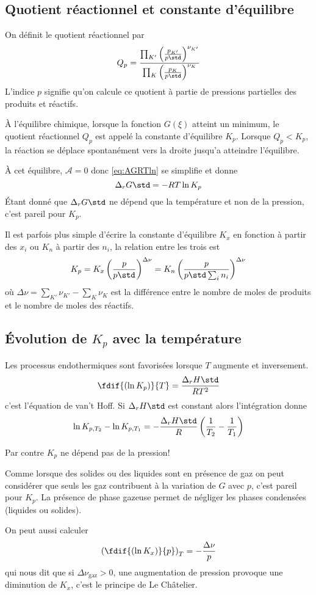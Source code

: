 \subsection{Quotient réactionnel et constante d'équilibre}
On définit le quotient réactionnel par
\[ Q_p = \frac {\prod_{K'}\left(\frac{p_{K'}}{p\std}\right)^{\nu_{K'}}}
{\prod_{K}\left(\frac{p_{K}}{p\std}\right)^{\nu_{K}}} \]
L'indice $p$ signifie qu'on calcule ce quotient
à partie de pressions partielles des produits et réactifs.

À l'équilibre chimique, lorsque la fonction $G(\xi)$ atteint un minimum,
le quotient réactionnel $Q_p$ est appelé la constante d'équilibre $K_p$.
Lorsque $Q_p < K_p$, la réaction se déplace spontanément
vers la droite jusqu'a atteindre l'équilibre.

À cet équilibre, $\mathcal{A} = 0$ donc \eqref{eq:AGRTln} se simplifie
et donne
\[ \Delta_rG\std = -RT\ln K_p \]
Étant donné que $\Delta_rG\std$ ne dépend que la température et
non de la pression, c'est pareil pour $K_p$.

Il est parfois plus simple d'écrire la constante d'équilibre $K_x$
en fonction à partir des $x_i$ ou $K_n$ à partir des $n_i$,
la relation entre les trois est
\[ K_p = K_x\left(\frac{p}{p\std}\right)^{\Delta \nu} =
K_n \left(\frac{p}{p\std\sum_i n_i}\right)^{\Delta \nu} \]
où $\Delta \nu = \sum_{K'}\nu_{K'}-\sum_K \nu_K$ est la différence entre
le nombre de moles de produits et le nombre de moles des réactifs.

\subsection{Évolution de $K_p$ avec la température}
Les processus endothermiques sont favorisées
lorsque $T$ augmente et inversement.
\[ \fdif{(\ln K_p)}{T} = \frac{\Delta_rH\std}{RT^2} \]
c'est l'équation de van't Hoff.
Si $\Delta_rH\std$ est constant alors l'intégration donne
\[ \ln K_{p,T_2}-\ln K_{p,T_1} = -\frac{\Delta_rH\std}{R}\left(\frac{1}{T_2}-
\frac{1}{T_1}\right) \]

Par contre $K_p$ ne dépend pas de la pression!

Comme lorsque des solides ou des liquides sont en présence de gaz on peut
considérer que seuls les gaz contribuent à la variation de $G$ avec $p$,
c'est pareil pour $K_p$.
La présence de phase gazeuse permet de négliger
les phases condensées (liquides ou solides).

On peut aussi calculer
\[ \left(\fdif{(\ln K_x)}{p}\right)_T = -\frac{\Delta\nu}{p} \]
qui nous dit que si $\Delta\nu_\mathrm{gaz} > 0$, une augmentation
de pression provoque une diminution de $K_x$, c'est le principe de Le
Châtelier.

